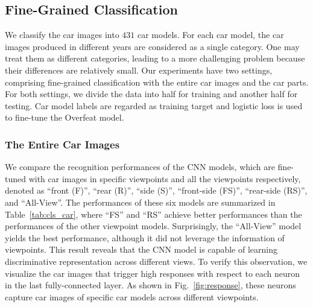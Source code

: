 \documentclass[10pt,twocolumn,letterpaper]{article}
\newcommand{\datasetName}{CompCars}
\begin{document}


\subsection{Fine-Grained Classification}

We classify the car images into $431$ car models. For each car model, the car images produced in different years are considered as a single category. One may treat them as different categories, leading to a more challenging problem because their differences are relatively small.
%
Our experiments have two settings, comprising fine-grained classification with the entire car images and the car parts. For both settings, we divide the data into half for training and another half for testing.
Car model labels are regarded as training target and logistic loss is used to fine-tune the Overfeat model.


\subsubsection{The Entire Car Images}\label{sec:cls}

We compare the recognition performances of the CNN models, which are fine-tuned with car images in specific viewpoints and all the viewpoints respectively, denoted as ``front (F)'', ``rear (R)'', ``side (S)'', ``front-side (FS)'', ``rear-side (RS)'', and ``All-View''.
%
The performances of these six models are summarized in Table~\ref{tab:cls_car}, where ``FS'' and ``RS'' achieve better performances than the performances of the other viewpoint models.
%
Surprisingly, the ``All-View'' model yields the best performance, although it did not leverage the information of viewpoints. This result reveals that the CNN model is capable of learning discriminative representation across different views.
%
To verify this observation, we visualize the car images that trigger high responses with respect to each neuron in the last fully-connected layer. As shown in Fig.~\ref{fig:response}, these neurons capture car images of specific car models across different viewpoints.
\end{document}
